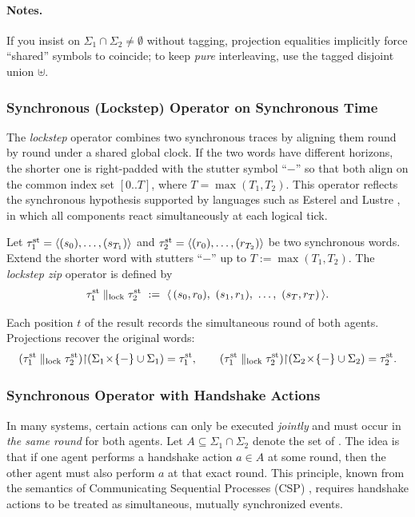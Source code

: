 \documentclass{article}
\begin{document}
  \paragraph{Notes.}
  If you insist on \(\Sigma_1\cap\Sigma_2\neq\emptyset\) without tagging, projection equalities implicitly force “shared” symbols to coincide; to keep \emph{pure} interleaving, use the tagged disjoint union \(\uplus\).
  
  \subsubsection{Synchronous (Lockstep) Operator on Synchronous Time}
  
  The \emph{lockstep} operator combines two synchronous traces by aligning them round by round under a shared global clock. 
  If the two words have different horizons, the shorter one is right-padded with the stutter symbol ``$-$'' so that both align on the common index set $[0..T]$, where $T=\max(T_1,T_2)$. 
  This operator reflects the synchronous hypothesis supported by languages such as Esterel and Lustre \cite{Halbwachs93}, in which all components react simultaneously at each logical tick.
  
  \begin{definition}
  Let $\tau^{\mathrm{st}}_1=\langle (s_0),\dots,(s_{T_1}) \rangle $ and 
  $\tau^{\mathrm{st}}_2=\langle (r_0),\dots,(r_{T_2}) \rangle $ be two synchronous words. 
  Extend the shorter word with stutters ``$-$'' up to 
  $T:=\max(T_1,T_2)$. 
  The \emph{lockstep zip} operator is defined by
  \[
  \tau^{\mathrm{st}}_1 \parallel_{\mathrm{lock}} \tau^{\mathrm{st}}_2
  \ :=\
  \langle \, (s_0,r_0),\ (s_1,r_1),\ \dots,\ (s_T,r_T)\,  \rangle .
  \]
  \end{definition}
  
  Each position $t$ of the result records the simultaneous round of both agents. 
  Projections recover the original words:
  \[
  (\tau^{\mathrm{st}}_1 \parallel_{\mathrm{lock}} \tau^{\mathrm{st}}_2){\upharpoonright}(\Sigma_1\!\times\!\{-\}\cup\Sigma_1)
  =\tau^{\mathrm{st}}_1,\qquad
  (\tau^{\mathrm{st}}_1 \parallel_{\mathrm{lock}} \tau^{\mathrm{st}}_2){\upharpoonright}(\Sigma_2\!\times\!\{-\}\cup\Sigma_2)
  =\tau^{\mathrm{st}}_2.
  \]
  
  
  \subsubsection{Synchronous Operator with Handshake Actions}
  
  In many systems, certain actions can only be executed \emph{jointly} and must occur in \emph{the same round} for both agents. 
  Let $A\subseteq \Sigma_1\cap\Sigma_2$ denote the set of \defn{handshake actions}. 
  The idea is that if one agent performs a handshake action $a\in A$ at some round, then the other agent must also perform $a$ at that exact round. 
  This principle, known from the semantics of Communicating Sequential Processes (CSP) \cite{Hoare85}, requires handshake actions to be treated as simultaneous, mutually synchronized events.
  
\end{document}
